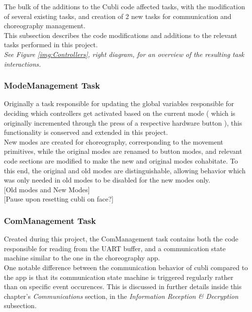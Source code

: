 The bulk of the additions to the Cubli code affected tasks, with the modification of several existing tasks, and creation of 2 new tasks for communication and choreography management.\\

This subsection describes the code modifications and additions to the relevant tasks performed in this project.\\

\textit{See Figure \ref{img:Controllers}, right diagram, for an overview of the resulting task interactions.}

\subsubsection{ModeManagement Task}

Originally a task responsible for updating the global variables responsible for deciding which controllers get activated based on the current mode ( which is originally incremented through the press of a respective hardware button ), this functionality is conserved and extended in this project.\\

New modes are created for choreography, corresponding to the movement primitives, while the original modes are renamed to button modes, and relevant code sections are modified to make the new and original modes cohabitate. To this end, the original and old modes are distinguishable, allowing behavior which was only needed in old modes to be disabled for the new modes only.\\

[Old modes and New Modes]\\

[Pause upon resetting cubli on face?]\\

\subsubsection{ComManagement Task}

Created during this project, the ComManagement task contains both the code responsible for reading from the UART buffer, and a communication state machine similar to the one in the choreography app.\\

One notable difference between the communication behavior of cubli compared to the app is that its communication state machine is triggered regularly rather than on specific event occurences. This is discussed in further details inside this chapter's \textit{Communications} section, in the \textit{Information Reception \& Decryption} subsection.\\ 

